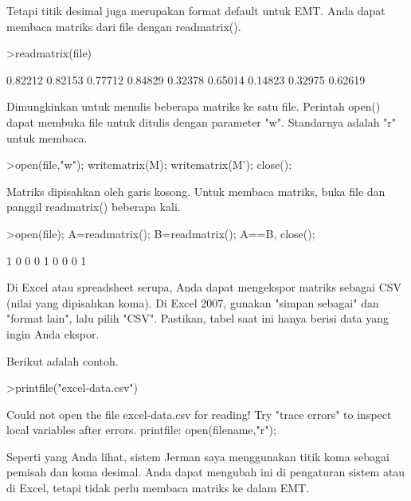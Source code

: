 \documentclass{article}
\begin{document}
\begin{eulernotebook}
\begin{eulercomment}
\begin{eulercomment}
\begin{eulercomment}
Tetapi titik desimal juga merupakan format default untuk EMT. Anda
dapat membaca matriks dari file dengan readmatrix().
\end{eulercomment}
\begin{eulerprompt}
>readmatrix(file)
\end{eulerprompt}
\begin{euleroutput}
    0.82212   0.82153   0.77712 
    0.84829   0.32378   0.65014 
    0.14823   0.32975   0.62619 
\end{euleroutput}
\begin{eulercomment}
Dimungkinkan untuk menulis beberapa matriks ke satu file. Perintah
open() dapat membuka file untuk ditulis dengan parameter "w".
Standarnya adalah "r" untuk membaca.
\end{eulercomment}
\begin{eulerprompt}
>open(file,"w"); writematrix(M); writematrix(M'); close();
\end{eulerprompt}
\begin{eulercomment}
Matriks dipisahkan oleh garis kosong. Untuk membaca matriks, buka file
dan panggil readmatrix() beberapa kali.
\end{eulercomment}
\begin{eulerprompt}
>open(file); A=readmatrix(); B=readmatrix(); A==B, close();
\end{eulerprompt}
\begin{euleroutput}
          1         0         0 
          0         1         0 
          0         0         1 
\end{euleroutput}
\begin{eulercomment}
Di Excel atau spreadsheet serupa, Anda dapat mengekspor matriks
sebagai CSV (nilai yang dipisahkan koma). Di Excel 2007, gunakan
"simpan sebagai" dan "format lain", lalu pilih "CSV". Pastikan, tabel
saat ini hanya berisi data yang ingin Anda ekspor.

Berikut adalah contoh.
\end{eulercomment}
\begin{eulerprompt}
>printfile("excel-data.csv")
\end{eulerprompt}
\begin{euleroutput}
  Could not open the file
  excel-data.csv
  for reading!
  Try "trace errors" to inspect local variables after errors.
  printfile:
      open(filename,"r");
\end{euleroutput}
\begin{eulercomment}
Seperti yang Anda lihat, sistem Jerman saya menggunakan titik koma
sebagai pemisah dan koma desimal. Anda dapat mengubah ini di
pengaturan sistem atau di Excel, tetapi tidak perlu membaca matriks ke
dalam EMT.


\end{eulercomment}
\end{eulercomment}
\end{eulercomment}
\end{eulernotebook}
\end{document}
